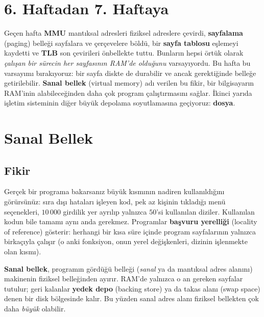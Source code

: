 \documentclass[11pt,a4paper]{article}
\newcommand{\term}[1]{\textbf{\color{mintdeep}#1}}
\begin{document}
\setcounter{tocdepth}{1}
\tableofcontents

\section{6. Haftadan 7. Haftaya}

Geçen hafta \term{MMU} mantıksal adresleri fiziksel adreslere çevirdi, \term{sayfalama} (paging) belleği sayfalara ve çerçevelere böldü, bir \term{sayfa tablosu} eşlemeyi kaydetti ve \term{TLB} son çevirileri önbellekte tuttu. Bunların hepsi örtük olarak \emph{çalışan bir sürecin her sayfasının RAM'de olduğunu} varsayıyordu. Bu hafta bu varsayımı bırakıyoruz: bir sayfa diskte de durabilir ve ancak gerektiğinde belleğe getirilebilir. \term{Sanal bellek} (virtual memory) adı verilen bu fikir, bir bilgisayarın RAM'inin alabileceğinden daha çok program çalıştırmasını sağlar. İkinci yarıda işletim sisteminin diğer büyük depolama soyutlamasına geçiyoruz: \term{dosya}.

\section{Sanal Bellek}

\subsection{Fikir}

Gerçek bir programa bakarsanız büyük kısmının nadiren kullanıldığını görürsünüz: sıra dışı hataları işleyen kod, pek az kişinin tıkladığı menü seçenekleri, $10\,000$ girdilik yer ayrılıp yalnızca $50$'si kullanılan diziler. Kullanılan kodun bile tamamı aynı anda gerekmez. Programlar \term{başvuru yerelliği} (locality of reference) gösterir: herhangi bir kısa süre içinde program sayfalarının yalnızca birkaçıyla çalışır (o anki fonksiyon, onun yerel değişkenleri, dizinin işlenmekte olan kısmı).

\begin{keyidea}
\textbf{Sanal bellek}, programın gördüğü belleği (\emph{sanal} ya da mantıksal adres alanını) makinenin fiziksel belleğinden ayırır. RAM'de yalnızca o an gereken sayfalar tutulur; geri kalanlar \term{yedek depo} (backing store) ya da takas alanı (swap space) denen bir disk bölgesinde kalır. Bu yüzden sanal adres alanı fiziksel bellekten çok daha \emph{büyük} olabilir.
\end{keyidea}
\end{document}
